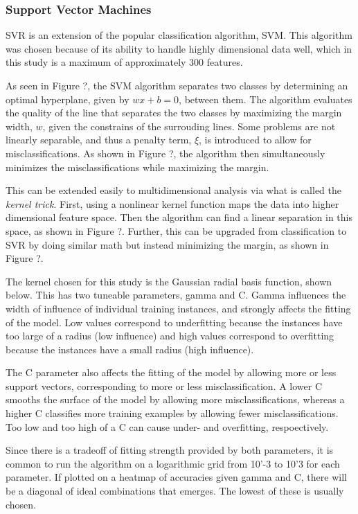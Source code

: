 \subsubsection{Support Vector Machines}
\label{sec:svm}

\gls{SVR} is an extension of the popular classification algorithm, \gls{SVM}.
This algorithm was chosen because of its ability to handle highly dimensional
data well, which in this study is a maximum of approximately 300 features. 

As seen in Figure ?, the \gls{SVM} algorithm separates two classes by
determining an optimal hyperplane, given by $wx+b = 0$, between them. The
algorithm evaluates the quality of the line that separates the two classes by
maximizing the margin width, $w$, given the constrains of the surrouding lines.
Some problems are not linearly separable, and thus a penalty term, $\xi$, is
introduced to allow for misclassifications. As shown in Figure ?, the algorithm
then simultaneously minimizes the misclassifications while maximizing the
margin. 

This can be extended easily to multidimensional analysis via what is called the
\textit{kernel trick}.  First, using a nonlinear kernel function maps the data
into higher dimensional feature space. Then the algorithm can find a linear
separation in this space, as shown in Figure ?. Further, this can be upgraded
from classification to SVR by doing similar math but instead minimizing the
margin, as shown in Figure ?. 

The kernel chosen for this study is the Gaussian radial basis function, shown
below. This has two tuneable parameters, gamma and C. Gamma influences the
width of influence of individual training instances, and strongly affects the
fitting of the model. Low values correspond to underfitting because the
instances have too large of a radius (low influence) and high values correspond
to overfitting because the instances have a small radius (high influence). 

The C parameter also affects the fitting of the model by allowing more or less
support vectors, corresponding to more or less misclassification. A lower C
smooths the surface of the model by allowing more misclassifications, whereas a
higher C classifies more training examples by allowing fewer
misclassifications. Too low and too high of a C can cause under- and
overfitting, respoectively. 

Since there is a tradeoff of fitting strength provided by both parameters, it
is common to run the algorithm on a logarithmic grid from 10'-3 to 10'3 for
each parameter. If plotted on a heatmap of accuracies given gamma and C, there
will be a diagonal of ideal combinations that emerges. The lowest of these is
usually chosen. 

